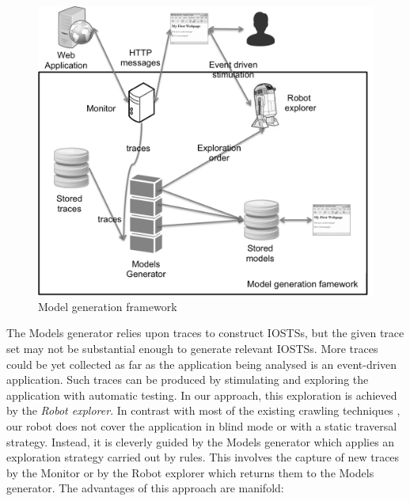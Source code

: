 \begin{figure}[ht]
    \begin{center}
        \includegraphics[width=1.0\linewidth]{figures/soict-framework.png}
    \end{center}

    \caption{Model generation framework}
    \label{fig:framework}
\end{figure}

The Models generator relies upon traces to construct IOSTSs, but
the given trace set may not be substantial enough to generate
relevant IOSTSs. More traces could be yet collected as far as
the application being analysed is an event-driven application.
Such traces can be produced by stimulating and exploring the
application with automatic testing. In our approach, this
exploration is achieved by the \emph{Robot explorer}. In contrast
with most of the existing crawling techniques
\cite{Memon:2003,concolicandroid12,crawljax:tweb12,Amalfitano:2012:UGR:2351676.2351717,WPX13},
our robot does not cover the application in blind mode or with a
static traversal strategy. Instead, it is cleverly guided by the
Models generator which applies an exploration strategy carried
out by rules. This involves the capture of new traces by the
Monitor or by the Robot explorer which returns them to the Models
generator. The advantages of this approach are manifold:

